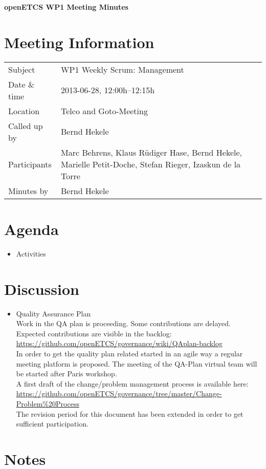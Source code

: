 \documentclass[a4paper, 11pt]{article}
\begin{document}
{\begin{center}\huge\bf openETCS WP1 Meeting Minutes\end{center}}
\section{Meeting Information}

\renewcommand{\arraystretch}{1.5}
\begin{supertabular}{m{.2\textwidth}m{.8\textwidth}}
Subject & WP1 Weekly Scrum: Management\\
Date \& time & 2013-06-28, 12:00h--12:15h\\
Location & Telco and Goto-Meeting\\
Called up by & Bernd Hekele\\
Participants &
Marc Behrens,
Klaus R\"udiger Hase,
Bernd Hekele,
Marielle Petit-Doche,
Stefan Rieger,
Izaskun de la Torre
\\

Minutes by & Bernd Hekele\\

\end{supertabular}
\renewcommand{\arraystretch}{1.0}


\section{Agenda}
\begin{itemize}
\item Activities
\end{itemize}

\section{Discussion}

\begin{itemize}
\item Quality Assurance Plan\\
Work in the QA plan is proceeding. Some contributions are delayed. Expected contributions are visible in the backlog:\\
\url{https://github.com/openETCS/governance/wiki/QAplan-backlog}\\

In order to get the quality plan related started in an agile way a regular meeting platform is proposed. The meeting of the QA-Plan virtual team will be started after Paris workshop.\\

A first draft of the change/problem management process is available here:\\
\url{https://github.com/openETCS/governance/tree/master/Change-Problem%20Process}\\
The revision period for this document has been extended in order to get sufficient participation.

\end{itemize}

\section{Notes}
\end{document}
